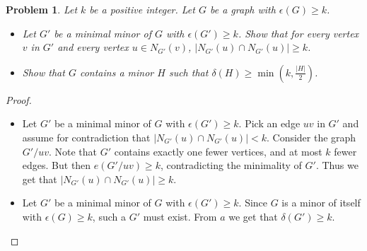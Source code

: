 \documentclass[12pt]{article}
\newtheorem{problem}{Problem}
\begin{document}
\begin{problem} Let $k$ be a positive integer. Let $G$ be a graph with
  $\epsilon(G) \geq k$.
  \begin{itemize}
  \item[(a)] Let $G'$ be a minimal minor of $G$ with
    $\epsilon(G') \geq k$. Show that for every vertex $v$ in $G'$ and
    every vertex $u \in N_{G'}(v)$,
    $|N_{G'}(u) \cap N_{G'}(u)| \geq k$.
  \item[(b)] Show that $G$ contains a minor $H$ such that
    $\delta(H) \geq \min(k, \frac{|H|}{2})$.
  \end{itemize}
\end{problem}
\begin{proof}
  \begin{itemize}
  \item[(a)] Let $G'$ be a minimal minor of $G$ with
    $\epsilon(G') \geq k$. Pick an edge $uv$ in $G'$ and assume for
    contradiction that $|N_{G'}(u) \cap N_{G'}(u)| < k$. Consider the
    graph $G'/uv$. Note that $G'$ contains exactly one fewer vertices,
    and at most $k$ fewer edges. But then $e(G'/uv) \geq k$,
    contradicting the minimality of $G'$. Thus we get that
    $|N_{G'}(u) \cap N_{G'}(u)| \geq k$.
  \item[(b)] Let $G'$ be a minimal minor of $G$ with
    $\epsilon(G') \geq k$. Since $G$ is a minor of itself with
    $\epsilon(G) \geq k$, such a $G'$ must exist. From $a$ we get that
    $\delta(G') \geq k$.
  \end{itemize}
\end{proof}
\end{document}
